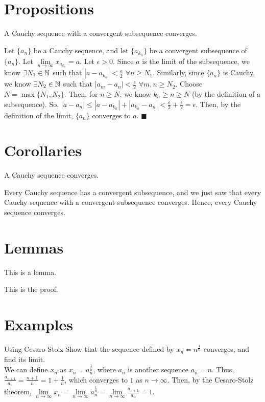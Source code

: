 \documentclass[a4paper,12pt]{article}
\begin{document}
\section{Propositions}
\begin{proposition}{}{}
    A Cauchy sequence with a convergent subsequence converges.
\end{proposition}
\begin{pproof*}{}{}
    Let $\{a_n\}$ be a Cauchy sequence, and let $\{a_{k_n}\}$ be a convergent subsequence of $\{a_n\}$.
    Let $\lim\limits_{n\to\infty}x_{a_{k_n}} = a$.
    Let $\epsilon > 0$.
    Since $a$ is the limit of the subsequence, we know $\exists N_1\in\mathbb{N}$ such that $|a - a_{k_n}| < \frac{\epsilon}{2}$ $\forall n\geq N_1$.
    Similarly, since $\{a_n\}$ is Cauchy, we know $\exists N_2\in\mathbb{N}$ such that $|a_m - a_n| < \frac{\epsilon}{2}$ $\forall m,n\geq N_2$.
    Choose $N = \max\{N_1, N_2\}$.
    Then, for $n\geq N$, we know $k_n \geq n \geq N$ (by the definition of a subsequence). 
    So, $|a - a_n| \leq |a - a_{k_n}| + |a_{k_n} - a_n| < \frac{\epsilon}{2} + \frac{\epsilon}{2} = \epsilon$.
    Then, by the definition of the limit, $\{a_n\}$ converges to $a$. $\blacksquare$
\end{pproof*}

\section{Corollaries}
\begin{corollary}{}{}
    A Cauchy sequence converges.
\end{corollary}
\begin{cproof*}{}{}
    Every Cauchy sequence has a convergent subsequence, and we just saw that every Cauchy sequence with a convergent subsequence converges.
    Hence, every Cauchy sequence converges.
\end{cproof*}

\section{Lemmas}
\begin{lemma}{}{}
    This is a lemma.
\end{lemma}
\begin{lproof*}{}{}
    This is the proof. 
\end{lproof*}

\section{Examples}
\begin{example}{Using Cesaro-Stolz}{}
    Show that the sequence defined by $x_n = n^\frac{1}{n}$ converges, and find its limit. \\

    We can define $x_n$ as $x_n = a_n^{\frac{1}{n}}$, where $a_n$ is another sequence $a_n = n$.
    Thus, $\frac{a_{n+1}}{a_n} = \frac{n+1}{n} = 1 + \frac{1}{n}$, which converges to $1$ as $n\to\infty$.
    Then, by the Cesaro-Stolz theorem, $\lim\limits_{n\to\infty}x_n = \lim\limits_{n\to\infty}a_n^{\frac{1}{n}} = \lim\limits_{n\to\infty} \frac{a_{n+1}}{a_n} = 1$.
\end{example}
\end{document}
